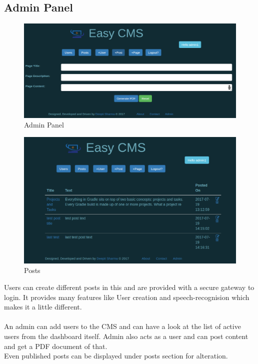 \subsection{Admin Panel}
\begin{figure}[h!]
	\centering \includegraphics[scale=.45]{input/images/easy3.png}
	\caption{Admin Panel}
\end{figure}

\begin{figure}[h!]
	\centering \includegraphics[scale=.49]{input/images/posts.png}
	\caption{Posts}
\end{figure}
Users can create different posts in this and are provided with a secure gateway to login. It provides many features like User creation and speech-recognision which makes it a little different.\\\\
An admin can add users to the CMS and can have a look at the list of active users from the dashboard itself. Admin also acts as a user and can post content and get a PDF document of that.\\
 Even published posts can be displayed under posts section for alteration.
\newpage
